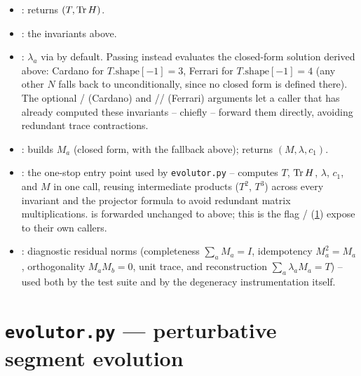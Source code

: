 \begin{implbox}
\begin{itemize}
  \item {}: returns $(T,\Tr H)$.
  \item {}: the invariants above.
  \item {}: $\lambda_a$ via
     by default. Passing 
    instead evaluates the closed-form solution derived above: Cardano for
    $T.\mathrm{shape}[-1]=3$, Ferrari for $T.\mathrm{shape}[-1]=4$ (any
    other $N$ falls back to  unconditionally, since no
    closed form is defined there). The optional /
    (Cardano) and // (Ferrari) arguments let a
    caller that has already computed these invariants -- chiefly
     -- forward them directly, avoiding
    redundant trace contractions.
  \item {}:
    builds $M_a$ (closed form, with the  fallback above);
    returns $(M,\lambda,c_1)$.
  \item {}: the one-stop entry point used by \texttt{evolutor.py} -- computes
    $T$, $\Tr H$, $\lambda$, $c_1$, and $M$ in one call, reusing intermediate
    products ($T^2$, $T^3$) across every invariant and the projector formula
    to avoid redundant matrix multiplications. 
    is forwarded unchanged to 
    above; this is the flag /%
     (\cref{sec:perturbative-evolutor})
    expose to their own callers.
  \item {}: diagnostic
    residual norms (completeness $\sum_aM_a=I$, idempotency
    $M_a^2=M_a$, orthogonality $M_aM_b=0$, unit trace, and
    reconstruction $\sum_a\lambda_aM_a=T$) -- used both by the test suite
    and by the degeneracy instrumentation itself.
\end{itemize}
\end{implbox}

\section{\texttt{evolutor.py} --- perturbative segment evolution}
\label{sec:perturbative-evolutor}

